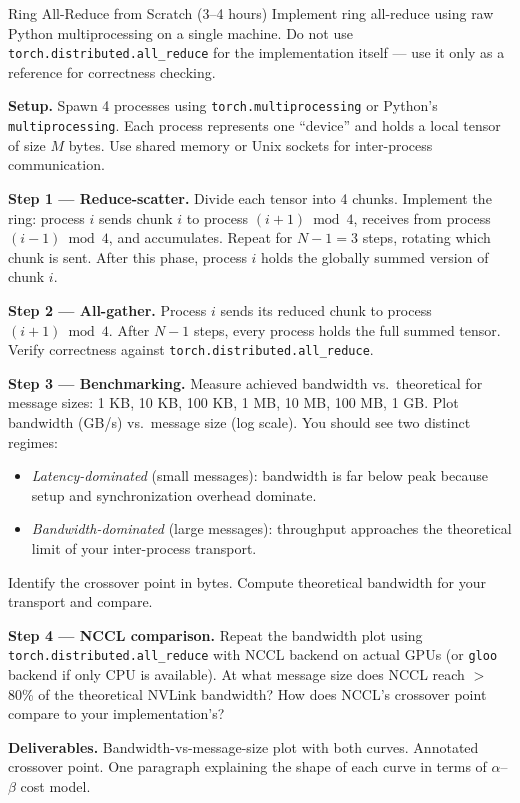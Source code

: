 \begin{exercise}{Ring All-Reduce from Scratch (3--4 hours)}
Implement ring all-reduce using raw Python multiprocessing on a single machine.
Do not use \texttt{torch.distributed.all\_reduce} for the implementation itself --- use it only as a
reference for correctness checking.

\medskip
\textbf{Setup.}
Spawn 4 processes using \texttt{torch.multiprocessing} or Python's \texttt{multiprocessing}.
Each process represents one ``device'' and holds a local tensor of size $M$ bytes.
Use shared memory or Unix sockets for inter-process communication.

\medskip
\textbf{Step 1 --- Reduce-scatter.}
Divide each tensor into 4 chunks.
Implement the ring: process $i$ sends chunk $i$ to process $(i+1) \bmod 4$,
receives from process $(i-1) \bmod 4$, and accumulates.
Repeat for $N-1 = 3$ steps, rotating which chunk is sent.
After this phase, process $i$ holds the globally summed version of chunk $i$.

\medskip
\textbf{Step 2 --- All-gather.}
Process $i$ sends its reduced chunk to process $(i+1) \bmod 4$.
After $N-1$ steps, every process holds the full summed tensor.
Verify correctness against \texttt{torch.distributed.all\_reduce}.

\medskip
\textbf{Step 3 --- Benchmarking.}
Measure achieved bandwidth vs.\ theoretical for message sizes:
1 KB, 10 KB, 100 KB, 1 MB, 10 MB, 100 MB, 1 GB.
Plot bandwidth (GB/s) vs.\ message size (log scale).
You should see two distinct regimes:
\begin{itemize}
  \item \emph{Latency-dominated} (small messages): bandwidth is far below peak because
        setup and synchronization overhead dominate.
  \item \emph{Bandwidth-dominated} (large messages): throughput approaches the
        theoretical limit of your inter-process transport.
\end{itemize}
Identify the crossover point in bytes.
Compute theoretical bandwidth for your transport and compare.

\medskip
\textbf{Step 4 --- NCCL comparison.}
Repeat the bandwidth plot using \texttt{torch.distributed.all\_reduce} with NCCL backend on actual
GPUs (or \texttt{gloo} backend if only CPU is available).
At what message size does NCCL reach $>$80\% of the theoretical NVLink bandwidth?
How does NCCL's crossover point compare to your implementation's?

\medskip
\textbf{Deliverables.} Bandwidth-vs-message-size plot with both curves.
Annotated crossover point.
One paragraph explaining the shape of each curve in terms of $\alpha$--$\beta$ cost model.
\end{exercise}

